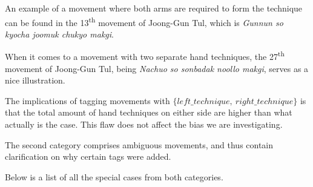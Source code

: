 \documentclass[10pt,twocolumn,a4paper]{article}
\begin{document}
  An example of a movement where both arms are required to form the technique
  can be found in the 13\textsuperscript{th} movement of Joong-Gun Tul, which
  is \emph{Gunnun so kyocha joomuk chukyo makgi}.

  When it comes to a movement with two separate hand techniques, the
  27\textsuperscript{th} movement of Joong-Gun Tul, being \emph{Nachuo so
  sonbadak noollo makgi}, serves as a nice illustration.

  The implications of tagging movements with $\{left\_technique, \:
  right\_technique\}$ is that the total amount of hand techniques on either
  side are higher than what actually is the case. This flaw does not affect
  the bias we are investigating.

  The second category comprises ambiguous movements, and thus contain
  clarification on why certain tags were added.

  Below is a list of all the special cases from both categories.
\end{document}
